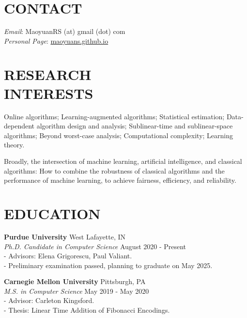 \documentclass[margin, 10pt]{res} %
\begin{document}
\begin{resume}

\section{CONTACT}
\emph{Email}: MaoyuanRS (at) gmail (dot) com\\
\emph{Personal Page}: \href{https://maoyuans.github.io}{maoyuans.github.io}

 
\section{RESEARCH \\ INTERESTS}  

Online algorithms; Learning-augmented algorithms; Statistical estimation; Data-dependent algorithm design and analysis; Sublinear-time and sublinear-space algorithms; Beyond worst-case analysis; Computational complexity; Learning theory.

Broadly, the intersection of machine learning, artificial intelligence, and classical algorithms: How to combine the robustness of classical algorithms and the performance of machine learning, to achieve fairness, efficiency, and reliability.
 
\section{EDUCATION}

{\bf Purdue University} \hfill West Lafayette, IN\\
{\it Ph.D. Candidate in Computer Science} \hfill August 2020 - Present\\
\hphantom{12}- Advisors: Elena Grigorescu, Paul Valiant.\\
\hphantom{12}- Preliminary examination passed, planning to graduate on May 2025.

{\bf Carnegie Mellon University} \hfill Pittsburgh, PA\\
{\it M.S. in Computer Science} \hfill May 2019 - May 2020 \\
\hphantom{12}- Advisor: Carleton Kingsford.\\
\hphantom{12}- Thesis: Linear Time Addition of Fibonacci Encodings.


\end{resume}
\end{document}
